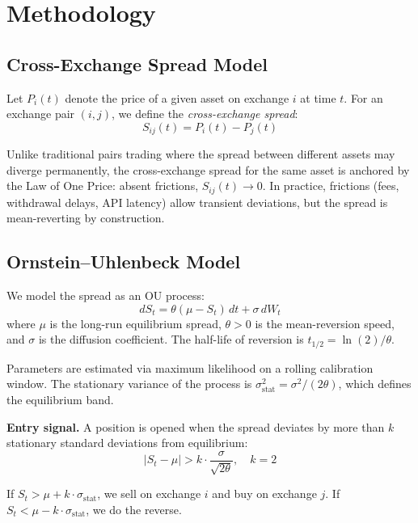 \documentclass[sigconf,nonacm=false]{acmart}
\begin{document}
\section{Methodology}\label{sec:method}

\subsection{Cross-Exchange Spread Model}

Let $P_i(t)$ denote the price of a given asset on exchange $i$ at time $t$. For an exchange pair $(i, j)$, we define the \emph{cross-exchange spread}:
\begin{equation}
    S_{ij}(t) = P_i(t) - P_j(t)
\end{equation}

Unlike traditional pairs trading where the spread between different assets may diverge permanently, the cross-exchange spread for the same asset is anchored by the Law of One Price: absent frictions, $S_{ij}(t) \to 0$. In practice, frictions (fees, withdrawal delays, API latency) allow transient deviations, but the spread is mean-reverting by construction.

\subsection{Ornstein--Uhlenbeck Model}\label{sec:ou}

We model the spread as an OU process:
\begin{equation}\label{eq:ou}
    dS_t = \theta(\mu - S_t)\, dt + \sigma\, dW_t
\end{equation}
where $\mu$ is the long-run equilibrium spread, $\theta > 0$ is the mean-reversion speed, and $\sigma$ is the diffusion coefficient. The half-life of reversion is $t_{1/2} = \ln(2) / \theta$.

Parameters are estimated via maximum likelihood on a rolling calibration window. The stationary variance of the process is $\sigma^2_{\text{stat}} = \sigma^2 / (2\theta)$, which defines the equilibrium band.

\textbf{Entry signal.} A position is opened when the spread deviates by more than $k$ stationary standard deviations from equilibrium:
\begin{equation}
    |S_t - \mu| > k \cdot \frac{\sigma}{\sqrt{2\theta}}, \quad k = 2
\end{equation}

If $S_t > \mu + k \cdot \sigma_{\text{stat}}$, we sell on exchange $i$ and buy on exchange $j$. If $S_t < \mu - k \cdot \sigma_{\text{stat}}$, we do the reverse.
\end{document}

